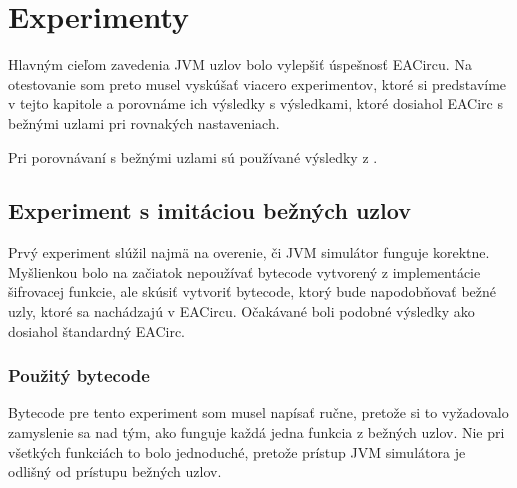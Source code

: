 \chapter{Experimenty}
\label{chap:experiments}

Hlavným cieľom zavedenia JVM uzlov bolo vylepšiť úspešnosť EACircu. Na otestovanie som preto musel vyskúšať viacero experimentov, ktoré si predstavíme v tejto kapitole a porovnáme ich výsledky s výsledkami, ktoré dosiahol EACirc s bežnými uzlami pri rovnakých nastaveniach. 

Pri porovnávaní s bežnými uzlami sú používané výsledky z \cite{baseline-experiment}. 

\section{Experiment s imitáciou bežných uzlov}
\label{sec:exp1}

Prvý experiment slúžil najmä na overenie, či JVM simulátor funguje korektne. Myšlienkou bolo na začiatok nepoužívať bytecode vytvorený z implementácie šifrovacej funkcie, ale skúsiť vytvoriť bytecode, ktorý bude napodobňovať bežné uzly, ktoré sa nachádzajú v EACircu. Očakávané boli podobné výsledky ako dosiahol štandardný EACirc.

\subsection{Použitý bytecode}
\label{subsec:exp1-bytecode}

Bytecode pre tento experiment som musel napísať ručne, pretože si to vyžadovalo zamyslenie sa nad tým, ako funguje každá jedna funkcia z bežných uzlov. Nie pri všetkých funkciách to bolo jednoduché, pretože prístup JVM simulátora je odlišný od prístupu bežných uzlov. 

